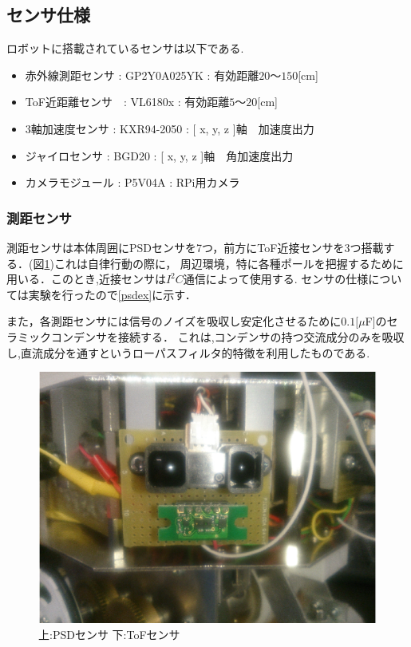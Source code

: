 \documentclass[11pt,a4]{jsarticle}
\begin{document}
\newpage
\subsection{センサ仕様}
ロボットに搭載されているセンサは以下である.
\begin{itemize}
 \item 赤外線測距センサ : GP2Y0A025YK : 有効距離$20 〜 150$[cm]
 \item ToF近距離センサ　: VL6180x    : 有効距離$5 〜 20$[cm]
 \item 3軸加速度センサ : KXR94-2050 : [ x, y, z ]軸　加速度出力
 \item ジャイロセンサ : BGD20 : [ x, y, z ]軸　角加速度出力
 \item カメラモジュール : P5V04A : RPi用カメラ
\end{itemize}
\subsubsection{測距センサ}
測距センサは本体周囲にPSDセンサを7つ，前方にToF近接センサを3つ搭載する．(図\ref{Distance})これは自律行動の際に，
周辺環境，特に各種ポールを把握するために用いる．このとき,近接センサは$I^2 C$通信によって使用する.
センサの仕様については実験を行ったので\ref{psdex}に示す．

また，各測距センサには信号のノイズを吸収し安定化させるために$0.1[\mu $F]のセラミックコンデンサを接続する．
これは,コンデンサの持つ交流成分のみを吸収し,直流成分を通すというローパスフィルタ的特徴を利用したものである.

\begin{figure}[b]
 \centering
 \includegraphics[width=0.5\hsize]{./picture/kakeru/Distance.eps}
    \caption{上:PSDセンサ 下:ToFセンサ}
    \label{Distance}
\end{figure}
\end{document}
